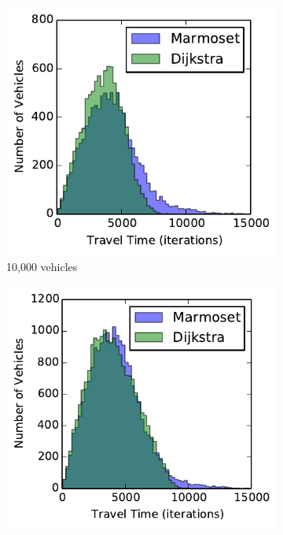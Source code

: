 \documentclass[ %
                    author={Alexander Hill},
                supervisor={Dr. Benjamin Sach},
                    degree={MEng},
                     title={MARMOSET},
                  subtitle={Multi-Agent Route Management using Online Simulation for Efficient Transportation},
                      type={research},
                      year={2016} ]{dissertation}
\begin{document}
\begin{figure}[h]
    \centering
    \begin{subfigure}[b]{0.23\textwidth}
        \centering
        \includegraphics[width=\textwidth]{tt-10k}
        \caption{10,000 vehicles}\label{fig:tt-hist-10k}
    \end{subfigure}
    \begin{subfigure}[b]{0.23\textwidth}
        \centering
        \includegraphics[width=\textwidth]{tt-20k}

\end{subfigure}
\end{figure}
\end{document}
